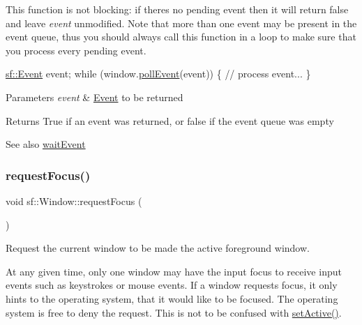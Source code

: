 This function is not blocking\+: if there\textquotesingle{}s no pending event then it will return false and leave {\itshape event} unmodified. Note that more than one event may be present in the event queue, thus you should always call this function in a loop to make sure that you process every pending event. 
\begin{DoxyCode}
\hyperlink{classsf_1_1_event}{sf::Event} event;
\textcolor{keywordflow}{while} (window.\hyperlink{classsf_1_1_window_a338e996585faf82e93069858e3b531b7}{pollEvent}(event))
\{
   \textcolor{comment}{// process event...}
\}
\end{DoxyCode}



\begin{DoxyParams}{Parameters}
{\em event} & \hyperlink{classsf_1_1_event}{Event} to be returned\\
\hline
\end{DoxyParams}
\begin{DoxyReturn}{Returns}
True if an event was returned, or false if the event queue was empty
\end{DoxyReturn}
\begin{DoxySeeAlso}{See also}
\hyperlink{classsf_1_1_window_aaf02ab64fbc1d374eef3696df54137bc}{wait\+Event} 
\end{DoxySeeAlso}
\mbox{\label{classsf_1_1_window_a58cf7fa1775e8e7542032e3ecfa83b49}} 
\subsubsection{\texorpdfstring{request\+Focus()}{requestFocus()}}
{\footnotesize\ttfamily void sf\+::\+Window\+::request\+Focus (\begin{DoxyParamCaption}{ }\end{DoxyParamCaption})}



Request the current window to be made the active foreground window. 

At any given time, only one window may have the input focus to receive input events such as keystrokes or mouse events. If a window requests focus, it only hints to the operating system, that it would like to be focused. The operating system is free to deny the request. This is not to be confused with \hyperlink{classsf_1_1_window_aaab549da64cedf74fa6f1ae7a3cc79e0}{set\+Active()}.

